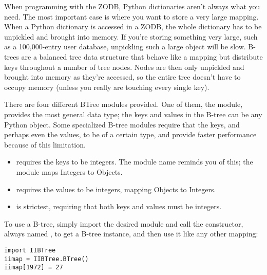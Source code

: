When programming with the ZODB, Python dictionaries aren't always what
you need.  The most important case is where you want to store a very
large mapping.  When a Python dictionary is accessed in a ZODB, the
whole dictionary has to be unpickled and brought into memory.  If
you're storing something very large, such as a 100,000-entry user
database, unpickling such a large object will be slow.  B-trees are a
balanced tree data structure that behave like a mapping but distribute
keys throughout a number of tree nodes.  Nodes are then only unpickled
and brought into memory as they're accessed, so the entire tree
doesn't have to occupy memory (unless you really are touching every
single key).

There are four different BTree modules provided.  One of them, the
 module, provides the most general data type; the keys
and values in the B-tree can be any Python object.  Some specialized B-tree
modules require that the keys, and perhaps even the values, to be of a
certain type, and provide faster performance because of this limitation.

\begin{itemize}
\item[ \module{IOBTree} ] requires the keys to be integers.
The module name reminds you of this; the  module
maps Integers to Objects.

\item[ \module{OIBTree} ] requires the values to be integers,
mapping Objects to Integers.

\item[ \module{IIBTree} ] is strictest, requiring that both keys and values must be integers.

\end{itemize}

To use a B-tree, simply import the desired module and call the
constructor, always named , to get a B-tree
instance, and then use it like any other mapping:

\begin{verbatim}
import IIBTree
iimap = IIBTree.BTree()
iimap[1972] = 27
\end{verbatim}

